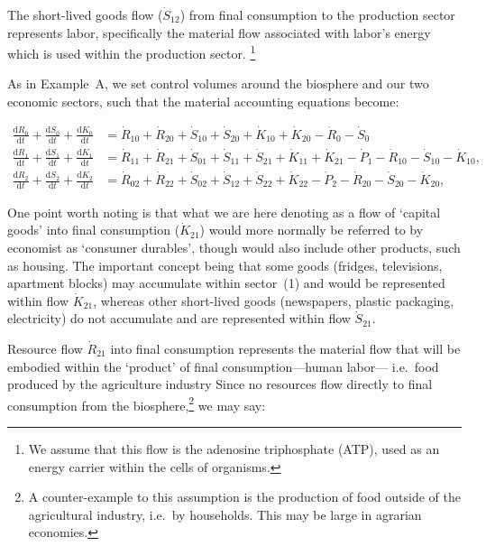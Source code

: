 

The short-lived goods flow ($\dot{S}_{12}$)
from final consumption to the production sector 
represents labor,
specifically  the material flow 
associated with labor's energy 
which is used within the production sector.
\footnote{We assume that this flow is the 
adenosine triphosphate (ATP), 
used as an energy
carrier within the cells of organisms.} 

As in Example~A, 
we set control volumes around the biosphere 
and our two economic sectors, 
such that the material accounting equations become:

\begin{align} 
\label{eq:B_CV_0}
	\frac{\mathrm{d}R_{0}}{\mathrm{d}t} 
	+ \frac{\mathrm{d}S_{0}}{\mathrm{d}t}	
	+ \frac{\mathrm{d}K_0}{\mathrm{d}t}		&
	=  \dot{R}_{10} + \dot{R}_{20} 
	+ \dot{S}_{10} + \dot{S}_{20} 
	+ \dot{K}_{10} + \dot{K}_{20} 
	- \dot{R}_{0} 
	- \dot{S}_{0} 							\\
\label{eq:B_CV_1}
	\frac{\mathrm{d}R_{1}}{\mathrm{d}t} 
	+ \frac{\mathrm{d}S_{1}}{\mathrm{d}t}	
	+ \frac{\mathrm{d}K_{1}}{\mathrm{d}t}	&
	=  \dot{R}_{11} 
	+ \dot{R}_{21}
	+ \dot{S}_{01} 
	+ \dot{S}_{11} 
	+ \dot{S}_{21}
	+ \dot{K}_{11}
	+ \dot{K}_{21}
	- \dot{P}_{1} 
	- \dot{R}_{10} 
	- \dot{S}_{10} 
	- \dot{K}_{10},							\\
\label{eq:B_CV_2}
	\frac{\mathrm{d}R_{2}}{\mathrm{d}t} 
	+ \frac{\mathrm{d}S_{2}}{\mathrm{d}t}
	+ \frac{\mathrm{d}K_{2}}{\mathrm{d}t}	&
	=  \dot{R}_{02} 
	+ \dot{R}_{22} 
	+ \dot{S}_{02} 
	+ \dot{S}_{12} 
	+ \dot{S}_{22} 
	+ \dot{K}_{22}
	- \dot{P}_{2}
	- \dot{R}_{20} 
	- \dot{S}_{20} 
	- \dot{K}_{20},
\end{align}

One point worth noting is that 
what we are here denoting as a flow of 
`capital goods'
into final consumption ($\dot{K}_{21}$) 
would more normally be referred to by economist as 
`consumer durables', 
though would also include other products, 
such as housing. 
The important concept being that some goods 
(fridges, televisions, apartment blocks) 
may accumulate within sector~(1)
and would be represented within flow 
$\dot{K}_{21}$, 
whereas other short-lived goods
(newspapers, plastic packaging, electricity) 
do not accumulate and are represented within flow 
$\dot{S}_{21}$.

Resource flow $\dot{R}_{21}$ 
into final consumption represents 
the material flow that will be embodied within the 
`product' of final consumption---human labor---
i.e.\ food produced by the agriculture industry
Since no resources flow directly to final consumption 
from the biosphere,\footnote{A counter-example
to this assumption is the production of food
outside of the agricultural industry, 
i.e.\ by households. 
This may be large in agrarian economies.}
 we may say:

